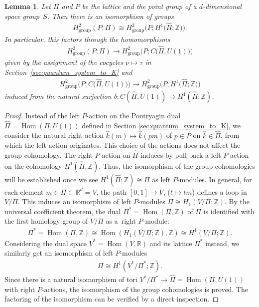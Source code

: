 \documentclass[pdftex]{sigma}
\newtheorem{lem}[thm]{Lemma}
\theoremstyle{definition}
\newcommand{\R}{\mathbb{R}}
\newcommand{\Z}{\mathbb{Z}}
\begin{document}
\begin{lem} \label{lem:cocycle_correspondence}
Let $\Pi$ and $P$ be the lattice and the point group of a $d$-dimensional space group~$S$. Then there is an isomorphism of groups
\begin{gather*}
H^2_{\mathrm{group}}(P; \Pi) \cong H^2_{\mathrm{group}}\big(P; H^1\big(\hat{\Pi}; \Z\big)\big).
\end{gather*}
In particular, this factors through the homomorphisms
\begin{gather*}
H^2_{\mathrm{group}}(P; \Pi) \longrightarrow H^2_{\mathrm{group}}\big(P; C\big(\hat{\Pi}, U(1)\big)\big)
\end{gather*}
given by the assignment of the cocycles $\nu \mapsto \tau$ in Section~{\rm \ref{sec:quantum_system_to_K}} and
\begin{gather*}
H^2_{\mathrm{group}}\big(P; C\big(\hat{\Pi}, U(1)\big)\big) \longrightarrow H^2_{\mathrm{group}}\big(P; H^1\big(\hat{\Pi}; \Z\big)\big)
\end{gather*}
induced from the natural surjection $\delta \colon C(\hat{\Pi}, U(1)) \to H^1(\hat{\Pi}; \Z)$.
\end{lem}


\begin{proof}
Instead of the left $P$-action on the Pontryagin dual $\hat{\Pi} = \operatorname{Hom}(\Pi, U(1))$ def\/ined in Section \ref{sec:quantum_system_to_K}, we consider the natural right action $\hat{k}(m) \mapsto \hat{k}(pm)$ of $p \in P$ on $\hat{k} \in \hat{\Pi}$, from which the left action originates. This choice of the actions does not af\/fect the group cohomology. The right $P$-action on $\hat{\Pi}$ induces by pull-back a left $P$-action on the cohomology $H^1(\hat{\Pi}; \Z)$. Thus, the isomorphism of the group cohomologies will be established once we see $H^1(\hat{\Pi}; \Z) \cong \Pi$ as left $P$-modules. In general, for each element $m \in \Pi \subset \R^d = V$, the path $[0, 1] \to V$, ($t \mapsto tm$) def\/ines a loop in $V/\Pi$. This induces an isomorphism of left $P$-modules $\Pi \cong H_1(V/\Pi; \Z)$. By the universal coef\/f\/icient theorem, the dual $\Pi^* = \operatorname{Hom}(\Pi, \Z)$ of $\Pi$ is identif\/ied with the f\/irst homology group of $V/\Pi$ as a~right $P$-module:
\begin{gather*}
\Pi^* = \operatorname{Hom}(\Pi, \Z) \cong \operatorname{Hom}(H_1(V/\Pi; \Z), \Z) \cong H^1(V/\Pi; \Z).
\end{gather*}
Considering the dual space $V^* = \operatorname{Hom}(V, \R)$ and its lattice $\Pi^*$ instead, we similarly get an isomorphism of left $P$-modules
\begin{gather*}
\Pi \cong H^1(V^*/\Pi^*; \Z).
\end{gather*}
Since there is a natural isomorphism of tori $V^*/\Pi^* \to \hat{\Pi} = \operatorname{Hom}(\Pi, U(1))$ with right $P$-actions, the isomorphism of the group cohomologies is proved. The factoring of the isomorphism can be verif\/ied by a direct inspection.
\end{proof}
\end{document}

